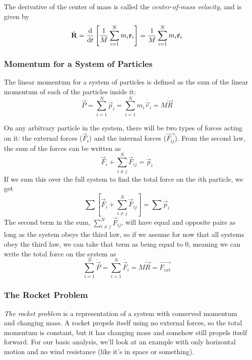 \documentclass[a4paper]{article}
\begin{document}
The derivative of the center of mass is called the
\emph{center-of-mass velocity}, and is given by
\[
    \dot{\boldsymbol{\mathbf{R}}} = \frac{\mathrm{d}}{\mathrm{d} t}\left[\frac{1}{M}\sum_{i=1}^Nm_i\boldsymbol{\mathbf{r}}_i\right]
    =\frac{1}{M}\sum_{i=1}^Nm_i\dot{\boldsymbol{\mathbf{r}}_i}
\]

\subsubsection{Momentum for a System of Particles}
The linear momentum for a system of particles is defined as the sum of the
linear momentum of each of the particles inside it:
\[
    \vec{P} = \sum_{i=1}^N \vec{p}_i = \sum_{i=1}^N m_i\dot{\vec{r}_i}
    = M\dot{\vec{R}}
\]

On any arbitrary particle in the system, there will be two types of forces
acting on it: the external forces ($\vec{F}_i$) 
and the internal forces ($\vec{F_{ij}}$). From the second law,
the sum of the forces can be written as
\[
    \vec{F}_i + \sum_{i\neq j}^N \vec{F}_{ij} = \dot{\vec{p}_i}
\]
If we sum this over the full system to find the total force on the
$i$th particle, we get
\[
    \sum\left[\vec{F}_i + \sum_{i\neq j}^N\vec{F}_{ij}\right] = \sum\dot{\vec{p}_i}
\]
The second term in the sum, $\sum_{i\neq j}^N\vec{F}_{ij}$, will have equal and
opposite pairs as long as the system obeys the third law, so if we
assume for now that all systems obey the third law, we can take that term as
being equal to 0, meaning we can write the total force on the system as
\[
    \sum_{i=1}^{N}\dot{\vec{P}} = \sum_{i=1}^{N} \dot{\vec{F}_i} = M\ddot{\vec{R}}=
    \vec{F_{ext}}
\]

\subsubsection{The Rocket Problem}
\emph{The rocket problem} is a representation of a system with conserved
momentum and changing mass. A rocket propels itself using no external forces,
so the total momentum is constant, but it has changing mass and somehow still
propels itself forward. For our basic analysis, we'll look at an example with
only horizontal motion and no wind resistance (like it's in space or something).
\end{document}
